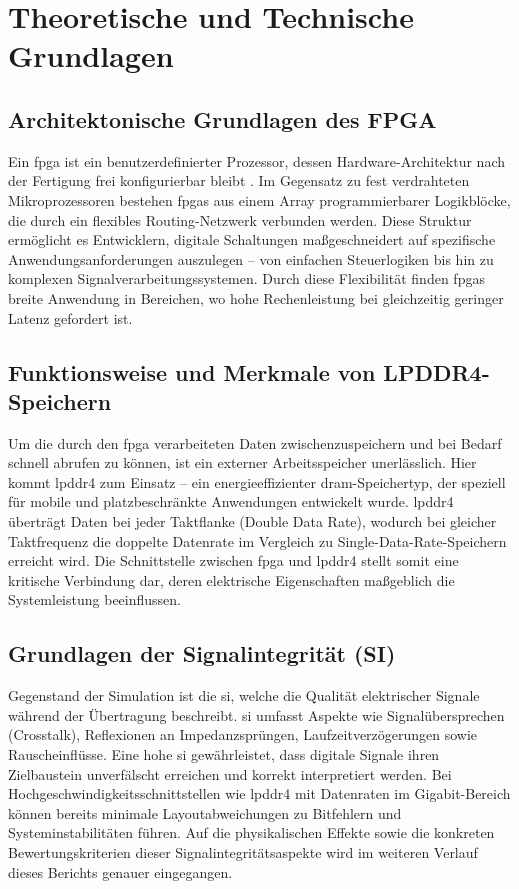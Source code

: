 \chapter{Theoretische und Technische Grundlagen}
\section{Architektonische Grundlagen des FPGA}
Ein \gls{fpga} ist ein benutzerdefinierter Prozessor, dessen Hardware-Architektur nach der Fertigung frei konfigurierbar bleibt \cite{digilent_fpga}. Im Gegensatz zu fest verdrahteten Mikroprozessoren bestehen \gls{fpga}s aus einem Array programmierbarer Logikblöcke, die durch ein flexibles Routing-Netzwerk verbunden werden. Diese Struktur ermöglicht es Entwicklern, digitale Schaltungen maßgeschneidert auf spezifische Anwendungsanforderungen auszulegen – von einfachen Steuerlogiken bis hin zu komplexen Signalverarbeitungssystemen. Durch diese Flexibilität finden \gls{fpga}s breite Anwendung in Bereichen, wo hohe Rechenleistung bei gleichzeitig geringer Latenz gefordert ist.

\section{Funktionsweise und Merkmale von LPDDR4-Speichern}
Um die durch den \gls{fpga} verarbeiteten Daten zwischenzuspeichern und bei Bedarf schnell abrufen zu können, ist ein externer Arbeitsspeicher unerlässlich. Hier kommt \gls{lpddr4} zum Einsatz – ein energieeffizienter \gls{dram}-Speichertyp, der speziell für mobile und platzbeschränkte Anwendungen entwickelt wurde. \gls{lpddr4} überträgt Daten bei jeder Taktflanke (Double Data Rate), wodurch bei gleicher Taktfrequenz die doppelte Datenrate im Vergleich zu Single-Data-Rate-Speichern erreicht wird. Die Schnittstelle zwischen \gls{fpga} und \gls{lpddr4} stellt somit eine kritische Verbindung dar, deren elektrische Eigenschaften maßgeblich die Systemleistung beeinflussen.

\section{Grundlagen der Signalintegrität (SI)}
Gegenstand der Simulation ist die \gls{si}, welche die Qualität elektrischer Signale während der Übertragung beschreibt. \gls{si} umfasst Aspekte wie Signalübersprechen (Crosstalk), Reflexionen an Impedanzsprüngen, Laufzeitverzögerungen sowie Rauscheinflüsse. Eine hohe \gls{si} gewährleistet, dass digitale Signale ihren Zielbaustein unverfälscht erreichen und korrekt interpretiert werden. Bei Hochgeschwindigkeitsschnittstellen wie \gls{lpddr4} mit Datenraten im Gigabit-Bereich können bereits minimale Layoutabweichungen zu Bitfehlern und Systeminstabilitäten führen. Auf die physikalischen Effekte sowie die konkreten Bewertungskriterien dieser Signalintegritätsaspekte wird im weiteren Verlauf dieses Berichts genauer eingegangen.

